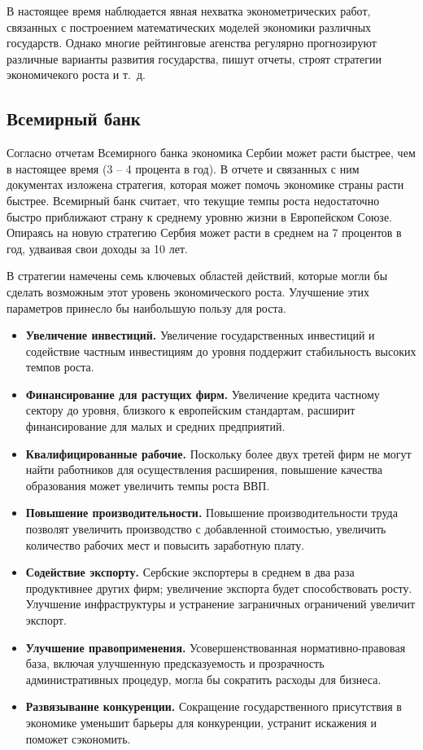 
В настоящее время наблюдается явная нехватка эконометрических работ, связанных с построением математических моделей экономики различных государств.
Однако многие рейтинговые агенства регулярно прогнозируют различные варианты развития государства, пишут отчеты, строят стратегии экономичекого роста и т.~д.

\subsection{Всемирный банк}

Согласно отчетам Всемирного банка экономика Сербии может расти быстрее, чем в настоящее время (3 -- 4 процента в год).
В отчете \cite{worldbank_cem} и связанных с ним документах \cite{worldbank_investment,worldbank_financing, worldbank_productivity, worldbank_encouraging, worldbank_labormarket, worldbank_barriers, worldbank_aid, worldbank_workforce} изложена стратегия, которая может помочь экономике страны расти быстрее.
Всемирный банк считает, что текущие темпы роста недостаточно быстро приближают страну к среднему уровню жизни в Европейском Союзе.
Опираясь на новую стратегию Сербия может расти в среднем на 7 процентов в год, удваивая свои доходы за 10 лет.

В стратегии намечены семь ключевых областей действий, которые могли бы сделать возможным этот уровень экономического роста.
Улучшение этих параметров принесло бы наибольшую пользу для роста.
\begin{itemize}
	\item \textbf{Увеличение инвестиций.}
	Увеличение государственных инвестиций и содействие частным инвестициям до уровня поддержит стабильность высоких темпов роста.
	\item \textbf{Финансирование для растущих фирм.}
	Увеличение кредита частному сектору до уровня, близкого к европейским стандартам, расширит финансирование для малых и средних предприятий.
	\item \textbf{Квалифицированные рабочие.}
	Поскольку более двух третей фирм не могут найти работников для осуществления расширения, повышение качества образования может увеличить темпы роста ВВП.
	\item \textbf{Повышение производительности.}
	Повышение производительности труда позволят увеличить производство с добавленной стоимостью, увеличить количество рабочих мест и повысить заработную плату.
	\item \textbf{Содействие экспорту.}
	Сербские экспортеры в среднем в два раза продуктивнее других фирм; увеличение экспорта будет способствовать росту.
	Улучшение инфраструктуры и устранение заграничных ограничений увеличит экспорт.
	\item \textbf{Улучшение правоприменения.}
	Усовершенствованная нормативно-правовая база, включая улучшенную предсказуемость и прозрачность административных процедур, могла бы сократить расходы для бизнеса.
	\item \textbf{Развязывание конкуренции.}
	Сокращение государственного присутствия в экономике уменьшит барьеры для конкуренции, устранит искажения и поможет сэкономить.
\end{itemize}

